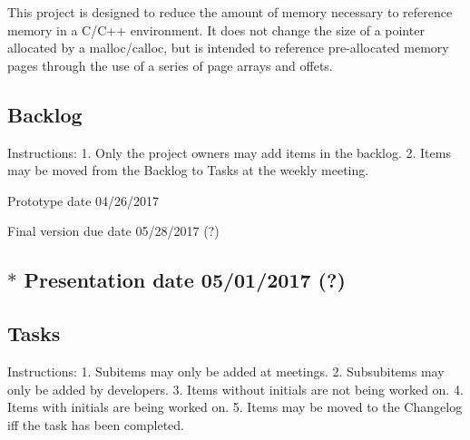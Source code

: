 This project is designed to reduce the amount of memory necessary to reference memory in a C/\+C++ environment. It does not change the size of a pointer allocated by a malloc/calloc, but is intended to reference pre-\/allocated memory pages through the use of a series of page arrays and offets.

\subsection*{Backlog}

\begin{DoxyVerb}Instructions:
1. Only the project owners may add items in the backlog.
2. Items may be moved from the Backlog to Tasks at the
   weekly meeting.
\end{DoxyVerb}



\begin{DoxyItemize}
\item Prototype date 04/26/2017
\item Final version due date 05/28/2017 (?) \subsection*{$\ast$ Presentation date 05/01/2017 (?) }
\end{DoxyItemize}

\subsection*{Tasks}

\begin{DoxyVerb}Instructions:
1. Subitems may only be added at meetings.
2. Subsubitems may only be added by developers.
3. Items without initials are not being worked on.
4. Items with initials are being worked on.
5. Items may be moved to the Changelog iff the task
   has been completed.
\end{DoxyVerb}



